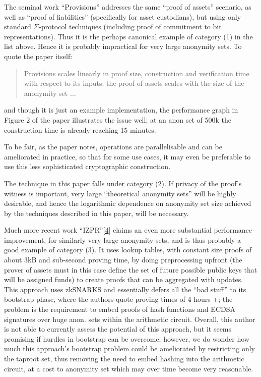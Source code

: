\documentclass[10pt,a4paper]{article}
\begin{document}
The seminal work ``Provisions'' addresses the same ``proof of assets'' scenario, as well as ``proof of liabilities'' (specifically for asset custodians), but using only standard $\Sigma$-protocol techniques (including proof of commitment to bit representations). Thus it is the perhaps canonical example of category (1) in the list above. Hence it is probably impractical for very large anonymity sets. To quote the paper itself:

\begin{quote}
Provisions scales linearly in proof size, construction and verification time with respect to its inputs: the proof of assets scales with the size of the anonymity set $\ldots$
\end{quote}

and though it is just an example implementation, the performance graph in Figure 2 of the paper illustrates the issue well; at an anon set of 500k the construction time is already reaching 15 minutes.

\vspace{5 pt}

To be fair, as the paper notes, operations are parallelisable and can be ameliorated in practice, so that for some use cases, it may even be preferable to use this less sophisticated cryptographic construction.

\vspace{5 pt}

The technique in this paper falls under category (2). If privacy of the proof's witness is important, very large ``theoretical anonymity sets'' will be highly desirable, and hence the logarithmic dependence on anonymity set size achieved by the techniques described in this paper, will be necessary.

\vspace{5 pt}

Much more recent work ``IZPR''{[}\protect\hyperlink{anchor-4}{4}{]} claims an even more substantial performance improvement, for similarly very large anonymity sets, and is thus probably a good example of category (3). It uses lookup tables, with constant size proofs of about 3kB and sub-second proving time, by doing preprocessing upfront (the prover of assets must in this case define the set of future possible public keys that will be assigned funds) to create proofs that can be aggregated with updates. This approach uses zkSNARKS and essentially defers all the ``bad stuff'' to its bootstrap phase, where the authors quote proving times of 4 hours +; the problem is the requirement to embed proofs of hash functions and ECDSA signatures over huge anon. sets within the arithmetic circuit. Overall, this author is not able to currently assess the potential of this approach, but it seems promising if hurdles in bootstrap can be overcome; however, we do wonder how much this approach's bootstrap problem could be ameliorated by restricting only the taproot set, thus removing the need to embed hashing into the arithmetic circuit, at a cost to anonymity set which may over time become very reasonable.
\end{document}
